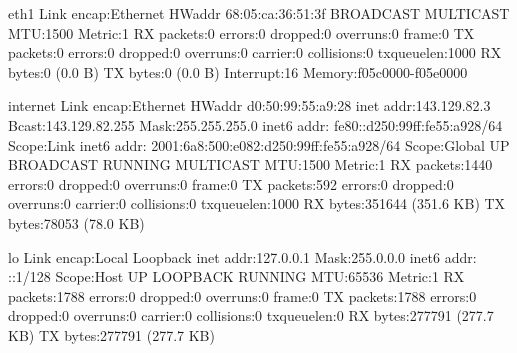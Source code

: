 eth1      Link encap:Ethernet  HWaddr 68:05:ca:36:51:3f  
          BROADCAST MULTICAST  MTU:1500  Metric:1
          RX packets:0 errors:0 dropped:0 overruns:0 frame:0
          TX packets:0 errors:0 dropped:0 overruns:0 carrier:0
          collisions:0 txqueuelen:1000 
          RX bytes:0 (0.0 B)  TX bytes:0 (0.0 B)
          Interrupt:16 Memory:f05c0000-f05e0000 

internet  Link encap:Ethernet  HWaddr d0:50:99:55:a9:28  
          inet addr:143.129.82.3  Bcast:143.129.82.255  Mask:255.255.255.0
          inet6 addr: fe80::d250:99ff:fe55:a928/64 Scope:Link
          inet6 addr: 2001:6a8:500:e082:d250:99ff:fe55:a928/64 Scope:Global
          UP BROADCAST RUNNING MULTICAST  MTU:1500  Metric:1
          RX packets:1440 errors:0 dropped:0 overruns:0 frame:0
          TX packets:592 errors:0 dropped:0 overruns:0 carrier:0
          collisions:0 txqueuelen:1000 
          RX bytes:351644 (351.6 KB)  TX bytes:78053 (78.0 KB)

lo        Link encap:Local Loopback  
          inet addr:127.0.0.1  Mask:255.0.0.0
          inet6 addr: ::1/128 Scope:Host
          UP LOOPBACK RUNNING  MTU:65536  Metric:1
          RX packets:1788 errors:0 dropped:0 overruns:0 frame:0
          TX packets:1788 errors:0 dropped:0 overruns:0 carrier:0
          collisions:0 txqueuelen:0 
          RX bytes:277791 (277.7 KB)  TX bytes:277791 (277.7 KB)



